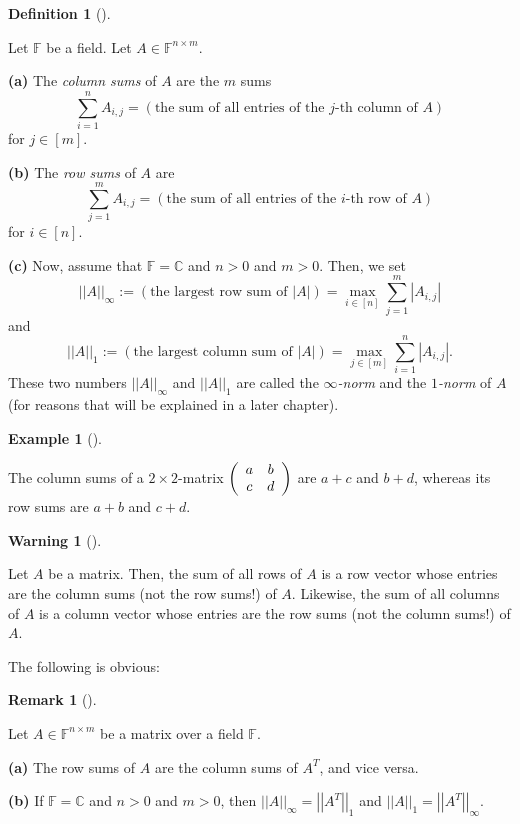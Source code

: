 \documentclass[numbers=enddot,12pt,final,onecolumn,notitlepage]{scrartcl}%
\numberwithin{exer}{subsection}
\theoremstyle{definition}
\newtheorem{defi}[theo]{Definition}
\newenvironment{definition}[1][]
{\begin{defi}[#1]\begin{leftbar}}
{\end{leftbar}\end{defi}}
\newtheorem{remk}[theo]{Remark}
\newenvironment{remark}[1][]
{\begin{remk}[#1]\begin{leftbar}}
{\end{leftbar}\end{remk}}
\newtheorem{warn}[theo]{Warning}
\newenvironment{warning}[1][]
{\begin{warn}[#1]\begin{leftbar}}
{\end{leftbar}\end{warn}}
\newtheorem{exam}[theo]{Example}
\newenvironment{example}[1][]
{\begin{exam}[#1]\begin{leftbar}}
{\end{leftbar}\end{exam}}
\newenvironment{warning}[1][Warning]{\noindent\textbf{#1.} }{\ \rule{0.5em}{0.5em}}
\let\sumnonlimits\sum
\renewcommand{\sum}{\sumnonlimits\limits}
\begin{document}
\begin{definition}
\label{def.posmat.infty1-norms}Let $\mathbb{F}$ be a field. Let $A\in
\mathbb{F}^{n\times m}$. \medskip

\textbf{(a)} The \emph{column sums} of $A$ are the $m$ sums
\[
\sum_{i=1}^{n}A_{i,j}=\left(  \text{the sum of all entries of the }j\text{-th
column of }A\right)
\]
for $j\in\left[  m\right]  $. \medskip

\textbf{(b)} The \emph{row sums} of $A$ are%
\[
\sum_{j=1}^{m}A_{i,j}=\left(  \text{the sum of all entries of the }i\text{-th
row of }A\right)
\]
for $i\in\left[  n\right]  $. \medskip

\textbf{(c)} Now, assume that $\mathbb{F}=\mathbb{C}$ and $n>0$ and $m>0$.
Then, we set%
\[
\left\vert \left\vert A\right\vert \right\vert _{\infty}:=\left(  \text{the
largest row sum of }\left\vert A\right\vert \right)  =\max\limits_{i\in\left[
n\right]  }\sum_{j=1}^{m}\left\vert A_{i,j}\right\vert
\]
and%
\[
\left\vert \left\vert A\right\vert \right\vert _{1}:=\left(  \text{the largest
column sum of }\left\vert A\right\vert \right)  =\max\limits_{j\in\left[
m\right]  }\sum_{i=1}^{n}\left\vert A_{i,j}\right\vert .
\]
These two numbers $\left\vert \left\vert A\right\vert \right\vert _{\infty}$
and $\left\vert \left\vert A\right\vert \right\vert _{1}$ are called the
$\infty$\emph{-norm} and the $1$\emph{-norm} of $A$ (for reasons that will be
explained in a later chapter).
\end{definition}

\begin{example}
The column sums of a $2\times2$-matrix $\left(
\begin{array}
[c]{cc}%
a & b\\
c & d
\end{array}
\right)  $ are $a+c$ and $b+d$, whereas its row sums are $a+b$ and $c+d$.
\end{example}

\begin{warning}
Let $A$ be a matrix. Then, the sum of all rows of $A$ is a row vector whose
entries are the column sums (not the row sums!) of $A$. Likewise, the sum of
all columns of $A$ is a column vector whose entries are the row sums (not the
column sums!) of $A$.
\end{warning}

The following is obvious:

\begin{remark}
\label{rmk.posmat.rowsums-AT}Let $A\in\mathbb{F}^{n\times m}$ be a matrix over
a field $\mathbb{F}$. \medskip

\textbf{(a)} The row sums of $A$ are the column sums of $A^{T}$, and vice
versa. \medskip

\textbf{(b)} If $\mathbb{F}=\mathbb{C}$ and $n>0$ and $m>0$, then $\left\vert
\left\vert A\right\vert \right\vert _{\infty}=\left\vert \left\vert
A^{T}\right\vert \right\vert _{1}$ and $\left\vert \left\vert A\right\vert
\right\vert _{1}=\left\vert \left\vert A^{T}\right\vert \right\vert _{\infty}$.
\end{remark}
\end{document}

